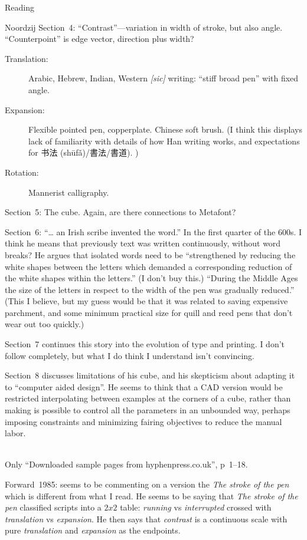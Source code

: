 \documentclass[11pt]{PalisadesLakesBook}
\begin{document}
\begin{plSection}{Reading}
\begin{plSection}{Noordzij}
Section~4: ``Contrast''---variation in width of stroke, 
but also angle.
``Counterpoint'' is edge vector, direction plus width?
\begin{description}
\item[Translation:] Arabic, Hebrew, Indian, Western \emph{[sic]}
 writing: ``stiff broad pen'' with fixed angle.
 \item[Expansion:] Flexible pointed pen, copperplate.
 Chinese soft brush. 
 (I think this displays lack of familiarity 
 with details of how Han writing works, and expectations for
 书法 (shūfǎ)/書法/書道). )
 \item[Rotation:] Mannerist calligraphy.
\end{description}

Section~5: The cube. Again, are there connections to Metafont?

Section~6: ``{\ldots} an Irish scribe invented the word.''
In the first quarter of the 600s.
I think he means that previously text was written continuously,
without word breaks?
He argues that isolated words need to be 
``strengthened by reducing the white shapes between the letters
which demanded a corresponding reduction of the white shapes 
within the letters.''
(I don't buy this.) 
``During the Middle Ages the size of the letters in respect 
to the width of the pen was gradually reduced.''
(This I believe, but my guess would be that it was related 
to saving expensive parchment, and some minimum practical size
for quill and reed pens that don't wear out too quickly.)
 
Section~7 continues this story into the evolution of type 
and printing. 
I don't follow completely, but what I do think I understand isn't
convincing.

Section~8 discusses limitations of his cube,
and his skepticism about adapting it to ``computer aided design''.
He seems to think that a CAD version would be restricted 
interpolating between examples at the corners of a cube,
rather than making is possible to control all the parameters
in an unbounded way, perhaps imposing constraints
and minimizing fairing objectives to reduce the manual labor.

\\
Only ``Downloaded sample pages from hyphenpress.co.uk'',
p~1--18.

Forward~1985: seems to be commenting on a version the 
\emph{The stroke of the pen} which is different from what I read.
He seems to be saying that \emph{The stroke of the pen}
classified scripts into a $2x2$ table:
\emph{running} vs \emph{interrupted} crossed with
\emph{translation} vs \emph{expansion}.
He then says that \emph{contrast} is a continuous scale
with pure \emph{translation} and \emph{expansion} as the endpoints.


\end{plSection}
\end{plSection}
\end{document}
